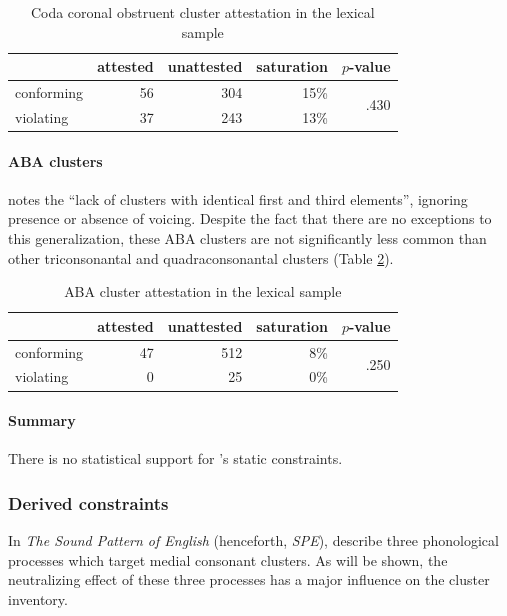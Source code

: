\begin{table}
\centering
\begin{tabular}{l rrrr}
\toprule
           & attested & unattested & saturation & $p$-value \\
\midrule
conforming & 56       & 304        & 15\%       & \multirow{2}{*}{.430} \\
violating  & 37       & 243        & 13\%       \\
\bottomrule
\end{tabular}
\caption{Coda coronal obstruent cluster attestation in the lexical sample}
\label{cctab}
\end{table}

\paragraph{ABA clusters} 
\citet[176]{Pierrehumbert1994} notes the ``lack of clusters with identical first and third elements'', ignoring presence or absence of voicing. 
Despite the fact that there are no exceptions to this generalization, these \textsc{ABA} clusters are not significantly less common than other triconsonantal and quadraconsonantal clusters (Table \ref{abatab}).

\begin{table}[ht]
\centering
\begin{tabular}{l rrrr}
\toprule
           & attested & unattested & saturation & $p$-value \\
\midrule
conforming & 47       & 512        &  8\%       & \multirow{2}{*}{.250} \\
violating  &  0       &  25        &  0\%       \\
\bottomrule
\end{tabular}
\caption{ABA cluster attestation in the lexical sample}
\label{abatab}
\end{table}

\paragraph{Summary} 
There is no statistical support for \citeauthor{Pierrehumbert1994}'s static constraints.

\subsubsection{Derived constraints}

In \emph{The Sound Pattern of English} (henceforth, \emph{SPE}), \citet{SPE} describe three phonological processes which target medial consonant clusters. As will be shown, the neutralizing effect of these three processes has a major influence on the cluster inventory.

